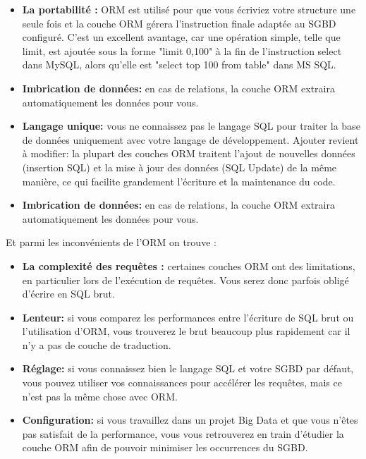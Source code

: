 \bigskip
\begin{itemize}
\item{\textbf{La portabilit\'{e} :}  ORM est utilis\'{e} pour que vous \'{e}criviez votre structure une
seule fois et la couche ORM g\'{e}rera l'instruction finale adapt\'{e}e au SGBD
configur\'{e}. C'est un excellent avantage, car une op\'{e}ration simple, telle que
limit, est ajout\'{e}e sous la forme "limit 0,100" \`{a} la fin de l'instruction select
dans MySQL, alors qu'elle est "select top 100 from table" dans MS SQL.}

\bigskip
\item{\textbf{Imbrication de donn\'{e}es:} en cas de relations, la couche ORM extraira
automatiquement les donn\'{e}es pour vous.}

\bigskip
\item{\textbf{Langage unique:} vous ne connaissez pas le langage SQL pour traiter la base
de donn\'{e}es uniquement avec votre langage de d\'{e}veloppement.
Ajouter revient \`{a} modifier: la plupart des couches ORM traitent l'ajout de
nouvelles donn\'{e}es (insertion SQL) et la mise \`{a} jour des donn\'{e}es (SQL
Update) de la m\^{e}me mani\`{e}re, ce qui facilite grandement l'\'{e}criture et la
maintenance du code.}

\item{\textbf{Imbrication de donn\'{e}es:} en cas de relations, la couche ORM extraira
automatiquement les donn\'{e}es pour vous.}

\end{itemize}

\bigskip

Et parmi les inconv\'{e}nients de l'ORM on trouve :



\bigskip

\begin{itemize}
\item{\textbf{ La complexit\'{e} des requ\^{e}tes : }certaines couches ORM ont des limitations, en
particulier lors de l'ex\'{e}cution de requ\^{e}tes. Vous serez donc parfois oblig\'{e}
d'\'{e}crire en SQL brut.}

\item{\textbf{Lenteur:}
 si vous comparez les performances entre l'\'{e}criture de SQL brut ou
l'utilisation d'ORM, vous trouverez le brut beaucoup plus rapidement car il
n'y a pas de couche de traduction.}

\item{\textbf{R\'{e}glage:} si vous connaissez bien le langage SQL et votre SGBD par d\'{e}faut,
vous pouvez utiliser vos connaissances pour acc\'{e}l\'{e}rer les requ\^{e}tes, mais ce
n'est pas la m\^{e}me chose avec ORM.}

\item{\textbf{Configuration:}
 si vous travaillez dans un projet Big Data et que vous n'\^{e}tes
pas satisfait de la performance, vous vous retrouverez en train d'\'{e}tudier la
couche ORM afin de pouvoir minimiser les occurrences du SGBD.}



\end{itemize}


